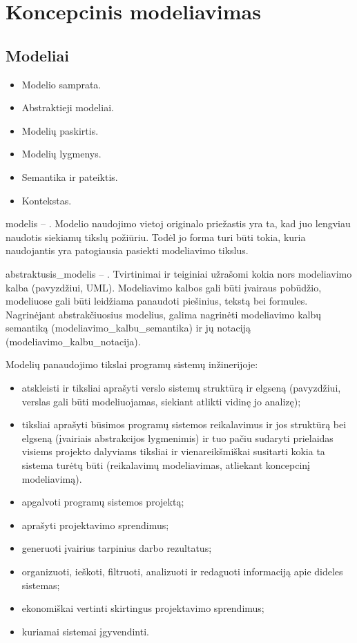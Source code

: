 \section{Koncepcinis modeliavimas}

\subsection{Modeliai}

\begin{itemize}
  \item Modelio samprata.
  \item Abstraktieji modeliai.
  \item Modelių paskirtis.
  \item Modelių lygmenys.
  \item Semantika ir pateiktis.
  \item Kontekstas.
\end{itemize}


\Gls{modelis} – . Modelio naudojimo vietoj originalo
priežastis yra ta, kad juo lengviau naudotis siekiamų tikslų požiūriu.
Todėl jo forma turi būti tokia, kuria naudojantis yra patogiausia
pasiekti modeliavimo tikslus.

\Gls{abstraktusis_modelis} – .
Tvirtinimai ir teiginiai užrašomi kokia nors modeliavimo kalba 
(pavyzdžiui, UML). Modeliavimo kalbos gali būti įvairaus pobūdžio,
modeliuose gali būti leidžiama panaudoti piešinius, tekstą bei formules.
Nagrinėjant abstrakčiuosius modelius, galima nagrinėti modeliavimo
kalbų semantiką (\gls{modeliavimo_kalbu_semantika}) ir jų notaciją
(\gls{modeliavimo_kalbu_notacija}).

Modelių panaudojimo tikslai programų sistemų inžinerijoje:
\begin{itemize}
  \item atskleisti ir tiksliai aprašyti verslo sistemų struktūrą ir
    elgseną (pavyzdžiui, verslas gali būti modeliuojamas, siekiant atlikti
    vidinę jo analizę);
  \item tiksliai aprašyti būsimos programų sistemos reikalavimus ir
    jos struktūrą bei elgseną (įvairiais abstrakcijos lygmenimis) ir
    tuo pačiu sudaryti prielaidas visiems projekto dalyviams tiksliai ir
    vienareikšmiškai susitarti kokia ta sistema turėtų būti 
    (reikalavimų modeliavimas, atliekant koncepcinį modeliavimą).
  \item apgalvoti programų sistemos projektą;
  \item aprašyti projektavimo sprendimus;
  \item generuoti įvairius tarpinius darbo rezultatus;
  \item organizuoti, ieškoti, filtruoti, analizuoti ir redaguoti
    informaciją apie dideles sistemas;
  \item ekonomiškai vertinti skirtingus projektavimo sprendimus;
  \item kuriamai sistemai įgyvendinti.
\end{itemize}

